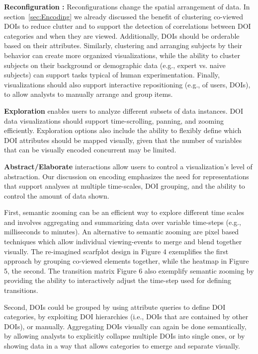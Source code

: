 \noindent \textbf{Reconfiguration :}
Reconfigurations change the spatial arrangement of data.  In section~\ref{sec:Encoding} we already discussed the benefit of clustering co-viewed DOIs to reduce clutter and to support the detection of correlations between DOI categories and when they are viewed. Additionally, DOIs should be orderable based on their attributes. Similarly, clustering and arranging subjects by their behavior can create more organized visualizations, while the ability to cluster subjects on their background or demographic data (e.g., expert vs. naive subjects) can support tasks typical of human experimentation. Finally, visualizations should also support interactive repositioning (e.g., of users, DOIs), to allow analysts to manually arrange and group items.


\noindent \textbf{Exploration} enables users to analyze different subsets of data instances. DOI data visualizations should support time-scrolling, panning, and zooming efficiently. Exploration options also include the ability to flexibly define which DOI attributes should be mapped visually, given that the number of variables that can be visually encoded concurrent may be limited. 
	
\noindent \textbf{Abstract/Elaborate} interactions allow users to control a visualization's level of abstraction. Our discussion on encoding emphasizes the need for representations that support analyses at multiple time-scales, DOI grouping, and the ability to control the amount of data shown. 

First, semantic zooming can be an efficient way to explore different time scales and involves aggregating and summarizing data over variable time-steps (e.g., milliseconds to minutes). An alternative to semantic zooming are pixel based techniques which allow individual viewing-events to merge and blend together visually\cite{keim2000designing}. The re-imagined scarfplot design in Figure 4 exemplifies the first approach by grouping co-viewed elements together, while the heatmap in Figure 5, the second. The transition matrix Figure 6 also exemplify semantic zooming by providing the ability to interactively adjust the time-step used for defining transitions.  

Second, DOIs could be grouped by using attribute queries to define DOI categories, by exploiting DOI hierarchies (i.e., DOIs that are contained by other DOIs), or manually. Aggregating DOIs visually can again be done semantically, by allowing analysts to explicitly collapse multiple DOIs into single ones, or by showing data in a way that allows categories to emerge and separate visually. 

